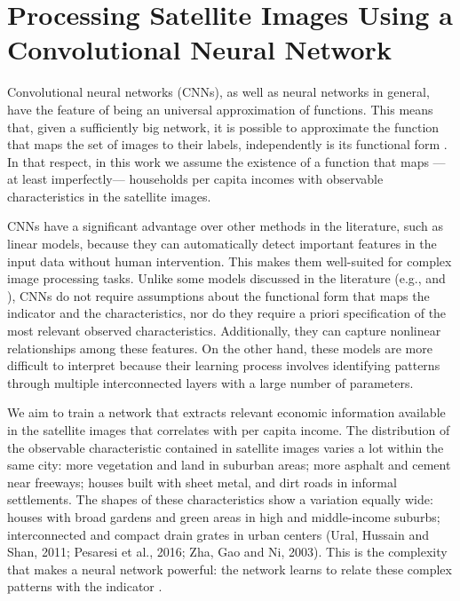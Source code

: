 \documentclass[conference]{IEEEtran}
\begin{document}
\section{Processing Satellite Images Using a Convolutional Neural Network} \label{sec:cnn}

Convolutional neural networks (CNNs), as well as neural networks in general, have the feature of being an universal approximation of functions. This means that, given a sufficiently big network, it is possible to approximate the function that maps the set of images to their labels, independently is its functional form \citep{Yarotsky2018}. In that respect, in this work we assume the existence of a function that maps ---at least imperfectly--- households per capita incomes with observable characteristics in the satellite images.

CNNs have a significant advantage over other methods in the literature, such as linear models, because they can automatically detect important features in the input data without human intervention. This makes them well-suited for complex image processing tasks. Unlike some models discussed in the literature (e.g., \citet{Jean2016} and \citet{Engstrom2022}), CNNs do not require assumptions about the functional form that maps the indicator and the characteristics, nor do they require a priori specification of the most relevant observed characteristics. Additionally, they can capture nonlinear relationships among these features. On the other hand, these models are more difficult to interpret because their learning process involves identifying patterns through multiple interconnected layers with a large number of parameters.

We aim to train a network that extracts relevant economic information available in the satellite images that correlates with per capita income. The distribution of the observable characteristic contained in satellite images varies a lot within the same city: more vegetation and land in suburban areas; more asphalt and cement near freeways; houses built with sheet metal, and dirt roads in informal settlements. The shapes of these characteristics show a variation equally wide: houses with broad gardens and green areas in high and middle-income suburbs; interconnected and compact drain grates in urban centers (Ural, Hussain and Shan, 2011; Pesaresi et al., 2016; Zha, Gao and Ni, 2003). This is the complexity that makes a neural network powerful: the network learns to relate these complex patterns with the indicator \citep{Khachiyan2022}.
\end{document}
